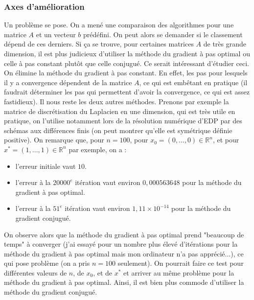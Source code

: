 \documentclass[9pt,a4paper]{article}
\begin{document}
\subsubsection{Axes d'amélioration}
Un problème se pose. On a mené une comparaison des algorithmes pour une matrice $A$ et un vecteur $b$ prédéfini. On peut alors se demander si le classement dépend de ces derniers. Si ça se trouve, pour certaines matrices $A$ de très grande dimension, il est plus judicieux d'utiliser la méthode du gradient à pas optimal ou celle à pas constant plutôt que celle conjugué. Ce serait intéressant d'étudier ceci.\newline
On élimine la méthode du gradient à pas constant. En effet, les pas pour lesquels il y a convergence dépendent de la matrice $A$, ce qui est embêtant en pratique (il faudrait déterminer les pas qui permettent d'avoir la convergence, ce qui est assez fastidieux). Il nous reste les deux autres méthodes.\newline
Prenons par exemple la matrice de discrétisation du Laplacien en une dimension, qui est très utile en pratique, on l'utilise notamment lors de la résolution numérique d'EDP par des schémas aux différences finis (on peut montrer qu'elle est symétrique définie positive).\newline
On remarque que, pour $n = 100$, pour $x_0 = (0,...,0) \in \mathbb{R}^n$, et pour $x^* = (1,...,1) \in \mathbb{R}^n$ par exemple, on a :
\begin{itemize}[label=\textbullet]
    \item l'erreur initiale vaut $10$.
    \item l'erreur à la $20000^e$ itération vaut environ $0,000563648$ pour la méthode du gradient à pas optimal.
    \item l'erreur à la $51^e$ itération vaut environ $1,11 \times10^{-14}$ pour la méthode du gradient conjugué.
\end{itemize}
On observe alors que la méthode du gradient à pas optimal prend "beaucoup de temps" à converger (j'ai essayé pour un nombre plus élevé d'itérations pour la méthode du gradient à pas optimal mais mon ordinateur n'a pas apprécié...), ce qui pose problème (on a pris $n = 100$ seulement).\newline
On pourrait faire ce test pour différentes valeurs de $n$, de $x_0$, et de $x^*$ et arriver au même problème pour la méthode du gradient à pas optimal.\newline
Ainsi, il est bien plus commode d'utiliser la méthode du gradient conjugué.
\end{document}
